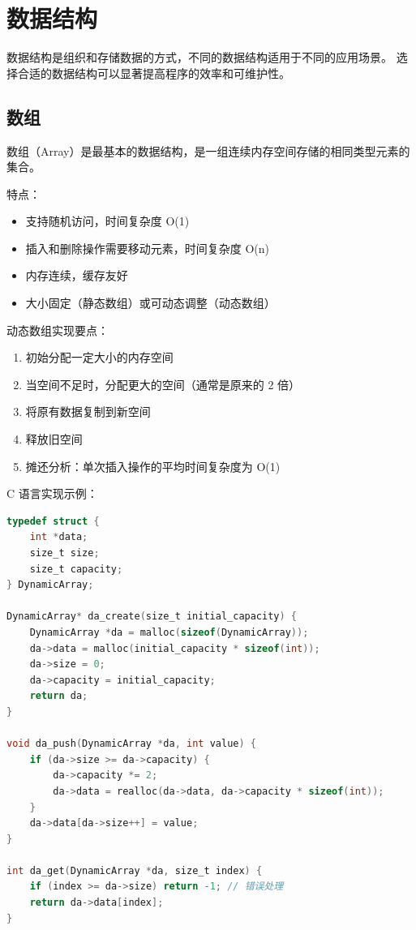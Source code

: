\section{数据结构}

数据结构是组织和存储数据的方式，不同的数据结构适用于不同的应用场景。
选择合适的数据结构可以显著提高程序的效率和可维护性。

\subsection{数组}


数组（Array）是最基本的数据结构，是一组连续内存空间存储的相同类型元素的集合。

特点：
\begin{itemize}
  \item 支持随机访问，时间复杂度 O(1)
  \item 插入和删除操作需要移动元素，时间复杂度 O(n)
  \item 内存连续，缓存友好
  \item 大小固定（静态数组）或可动态调整（动态数组）
\end{itemize}

动态数组实现要点：
\begin{enumerate}
  \item 初始分配一定大小的内存空间
  \item 当空间不足时，分配更大的空间（通常是原来的 2 倍）
  \item 将原有数据复制到新空间
  \item 释放旧空间
  \item 摊还分析：单次插入操作的平均时间复杂度为 O(1)
\end{enumerate}

C 语言实现示例：

\begin{lstlisting}[language=C, caption={动态数组实现}]
typedef struct {
    int *data;
    size_t size;
    size_t capacity;
} DynamicArray;

DynamicArray* da_create(size_t initial_capacity) {
    DynamicArray *da = malloc(sizeof(DynamicArray));
    da->data = malloc(initial_capacity * sizeof(int));
    da->size = 0;
    da->capacity = initial_capacity;
    return da;
}

void da_push(DynamicArray *da, int value) {
    if (da->size >= da->capacity) {
        da->capacity *= 2;
        da->data = realloc(da->data, da->capacity * sizeof(int));
    }
    da->data[da->size++] = value;
}

int da_get(DynamicArray *da, size_t index) {
    if (index >= da->size) return -1; // 错误处理
    return da->data[index];
}
\end{lstlisting}

